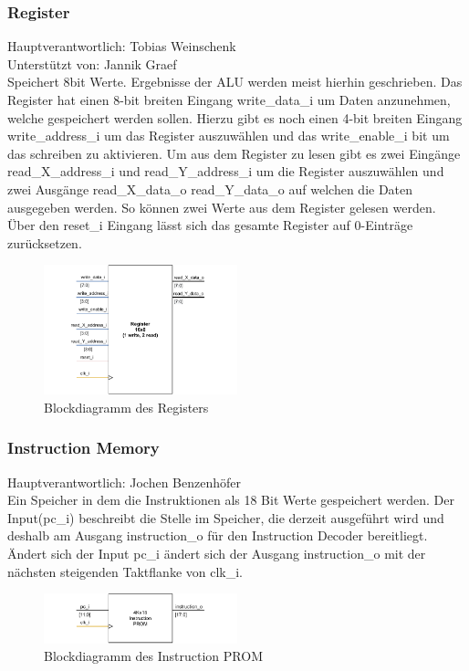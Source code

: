 \documentclass[bibliography=totoc,listof=totoc,index=totoc]{scrartcl}
\begin{document}
\subsubsection{Register}
\begin{multicols}{2}
Hauptverantwortlich: Tobias Weinschenk\\
Unterstützt von: Jannik Graef\\
Speichert 8bit Werte. Ergebnisse der ALU werden meist hierhin geschrieben. Das Register hat einen 8-bit breiten Eingang write\_data\_i um Daten anzunehmen, welche gespeichert werden sollen. Hierzu gibt es noch einen 4-bit breiten Eingang write\_address\_i um das Register auszuwählen und das write\_enable\_i bit um das schreiben zu aktivieren. Um aus dem Register zu lesen gibt es zwei Eingänge read\_X\_address\_i und read\_Y\_address\_i um die Register auszuwählen und zwei Ausgänge read\_X\_data\_o read\_Y\_data\_o auf welchen die Daten ausgegeben werden. So können zwei Werte aus dem Register gelesen werden. Über den reset\_i Eingang lässt sich das gesamte Register auf 0-Einträge zurücksetzen.
\begin{figure}[H]
    \centering
    \includegraphics[width=0.5\textwidth]{Register_beschreibung.pdf}
    \caption{Blockdiagramm des Registers}
    \label{fig:Block_Register}
\end{figure}
\end{multicols}
\newpage
\subsubsection{Instruction Memory}
\begin{multicols}{2}
Hauptverantwortlich: Jochen Benzenhöfer\\
Ein Speicher in dem die Instruktionen als 18 Bit Werte gespeichert werden. Der Input(pc\_i) beschreibt die Stelle im Speicher, die derzeit ausgeführt wird und deshalb am Ausgang instruction\_o für den Instruction Decoder bereitliegt. Ändert sich der Input pc\_i ändert sich der Ausgang instruction\_o mit der nächsten steigenden Taktflanke von clk\_i.
\begin{figure}[H]
    \centering
    \includegraphics[width=0.5\textwidth]{IP_beschreibung.pdf}
    \caption{Blockdiagramm des Instruction PROM}
    \label{fig:Block_InstructionPROM}
\end{figure}
\end{multicols}
\end{document}
